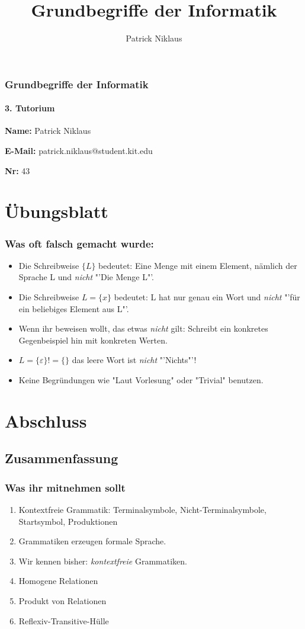 \documentclass{beamer}
\title{Grundbegriffe der Informatik}
\author{Patrick Niklaus}
\begin{document}
\begin{frame}
  \frametitle{Grundbegriffe der Informatik}
  \framesubtitle{3. Tutorium}
  \begin{description}
    \item \textbf{Name:} Patrick Niklaus
    \item \textbf{E-Mail:} patrick.niklaus@student.kit.edu
    \item \textbf{Nr:} 43
  \end{description}
\end{frame}

\section{Übungsblatt}
\begin{frame}
  \frametitle{Was oft falsch gemacht wurde:}
  \begin{itemize}
    \item Die Schreibweise $\{L\}$ bedeutet: Eine Menge mit einem Element, nämlich der Sprache L und \emph{nicht} "'Die Menge L"'.
    \item Die Schreibweise $L = \{x\}$ bedeutet: L hat nur genau ein Wort und \emph{nicht} "'für ein beliebiges Element aus L"'.
    \item Wenn ihr beweisen wollt, das etwas \emph{nicht} gilt: Schreibt ein konkretes Gegenbeispiel hin mit konkreten Werten.
    \item $L = \{\varepsilon\} != \{\}$ das leere Wort ist \emph{nicht} "'Nichts"'!
    \item Keine Begründungen wie "Laut Vorlesung" oder "Trivial" benutzen.
  \end{itemize}
\end{frame}




\section{Abschluss}
\subsection{Zusammenfassung}
\begin{frame}
  \frametitle{Was ihr mitnehmen sollt}
  \begin{enumerate}
    \item Kontextfreie Grammatik: Terminalsymbole, Nicht-Terminalsymbole, Startsymbol, Produktionen
    \item Grammatiken erzeugen formale Sprache.
    \item Wir kennen bisher: \emph{kontextfreie} Grammatiken.
    \item Homogene Relationen
    \item Produkt von Relationen
    \item Reflexiv-Transitive-Hülle
  \end{enumerate}
\end{frame}
\end{document}

